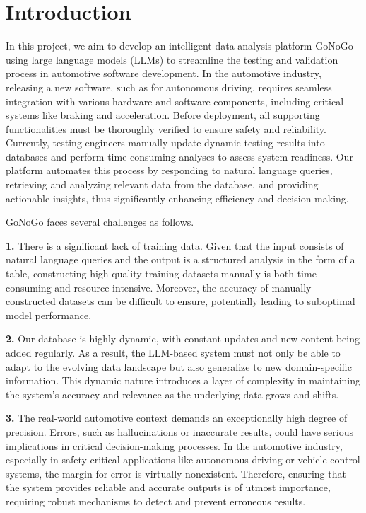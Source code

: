 \section{Introduction}
In this project, we aim to develop an intelligent data analysis platform GoNoGo using large language models (LLMs) to streamline the testing and validation process in automotive software development. In the automotive industry, releasing a new software, such as for autonomous driving, requires seamless integration with various hardware and software components, including critical systems like braking and acceleration. Before deployment, all supporting functionalities must be thoroughly verified to ensure safety and reliability. Currently, testing engineers manually update dynamic testing results into databases and perform time-consuming analyses to assess system readiness. Our platform automates this process by responding to natural language queries, retrieving and analyzing relevant data from the database, and providing actionable insights, thus significantly enhancing efficiency and decision-making.

GoNoGo faces several challenges as follows.

\textbf{1.} There is a significant lack of training data. Given that the input consists of natural language queries and the output is a structured analysis in the form of a table, constructing high-quality training datasets manually is both time-consuming and resource-intensive. Moreover, the accuracy of manually constructed datasets can be difficult to ensure, potentially leading to suboptimal model performance.

\textbf{2.} Our database is highly dynamic, with constant updates and new content being added regularly. As a result, the LLM-based system must not only be able to adapt to the evolving data landscape but also generalize to new domain-specific information. This dynamic nature introduces a layer of complexity in maintaining the system's accuracy and relevance as the underlying data grows and shifts.

\textbf{3.} The real-world automotive context demands an exceptionally high degree of precision. Errors, such as hallucinations or inaccurate results, could have serious implications in critical decision-making processes. In the automotive industry, especially in safety-critical applications like autonomous driving or vehicle control systems, the margin for error is virtually nonexistent. Therefore, ensuring that the system provides reliable and accurate outputs is of utmost importance, requiring robust mechanisms to detect and prevent erroneous results. 


